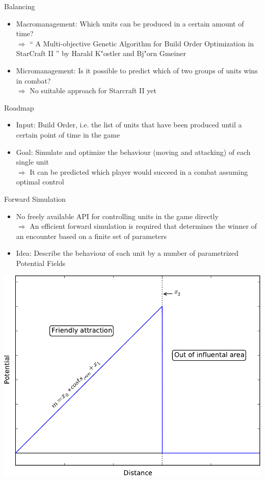 \documentclass{beamer}
\begin{document}
\begin{frame}{Balancing}
\begin{itemize}
\item \alert{Macromanagement:} Which units can be produced in a certain amount of time?
\\ $\Rightarrow$ `` A Multi-objective Genetic Algorithm for Build Order Optimization in StarCraft II '' by Harald K"ostler and Bj"orn Gmeiner
\item \alert{Micromanagement:} Is it possible to predict which of two groups of units wins in combat?
\\ $\Rightarrow$ No suitable approach for Starcraft II yet
\end{itemize}
\end{frame}

\begin{frame}{Roadmap}
\begin{itemize}
\item \alert{Input:} Build Order, i.e. the list of units that have been produced until a certain point of time in the game
\item \alert{Goal:} Simulate and optimize the behaviour (moving and attacking) of each single unit
\\ $\Rightarrow$ It can be predicted which player would succeed in a combat assuming optimal control
\end{itemize}
\end{frame}

\begin{frame}{Forward Simulation}
    \begin{itemize}
\item No freely available API for controlling units in the game directly
\\ $\Rightarrow$ An efficient forward simulation is required that determines the winner of an encounter based on a finite set of parameters
\item \alert{Idea:} Describe the behaviour of each unit by a number of parametrized \alert{Potential Fields}
\end{itemize}
\begin{center}
  \includegraphics[width=0.45\linewidth]{friend-crop.pdf}
\end{center}
\end{frame}
\end{document}
